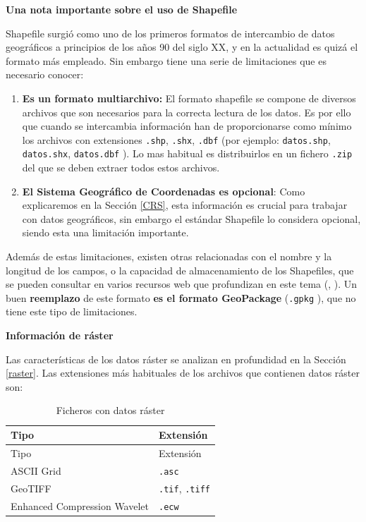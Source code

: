 \documentclass[
]{report}
\theoremstyle{definition}
\theoremstyle{definition}
\theoremstyle{definition}
\theoremstyle{definition}
\theoremstyle{remark}
\begin{document}
\textbf{Una nota importante sobre el uso de Shapefile}

Shapefile surgió como uno de los primeros formatos de intercambio de datos
geográficos a principios de los años 90 del siglo XX, y en la actualidad es
quizá el formato más empleado. Sin embargo tiene una serie de limitaciones que
es necesario conocer:

\begin{enumerate}
\def\labelenumi{\arabic{enumi}.}
\item
  \textbf{Es un formato multiarchivo:} El formato shapefile se compone de diversos
  archivos que son necesarios para la correcta lectura de los datos. Es por
  ello que cuando se intercambia información han de proporcionarse como mínimo
  los archivos con extensiones \texttt{.shp}, \texttt{.shx}, \texttt{.dbf} (por ejemplo:
  \texttt{datos.shp}, \texttt{datos.shx}, \texttt{datos.dbf} ). Lo mas habitual es distribuirlos en
  un fichero \texttt{.zip} del que se deben extraer todos estos archivos.
\item
  \textbf{El Sistema Geográfico de Coordenadas es opcional}: Como explicaremos en
  la Sección \ref{CRS}, esta información es crucial para trabajar con datos
  geográficos, sin embargo el estándar Shapefile lo considera opcional, siendo
  esta una limitación importante.
\end{enumerate}

Además de estas limitaciones, existen otras relacionadas con el nombre y la
longitud de los campos, o la capacidad de almacenamiento de los Shapefiles, que
se pueden consultar en varios recursos web que profundizan en este tema
(\citet{morales2012}, \citet{opengeolabs2017}). Un buen \textbf{reemplazo} de este formato \textbf{es el
formato GeoPackage} (\texttt{.gpkg} ), que no tiene este tipo de limitaciones.

\textbf{Información de ráster}

Las características de los datos ráster se analizan en profundidad en la Sección
\ref{raster}. Las extensiones más habituales de los archivos que contienen
datos ráster son:

\begin{longtable}[]{@{}ll@{}}
\caption{Ficheros con datos ráster}\tabularnewline
\toprule
Tipo & Extensión \\
\midrule
\endfirsthead
\toprule
Tipo & Extensión \\
\midrule
\endhead
ASCII Grid & \texttt{.asc} \\
GeoTIFF & \texttt{.tif}, \texttt{.tiff} \\
Enhanced Compression Wavelet & \texttt{.ecw} \\
\bottomrule
\end{longtable}
\end{document}
